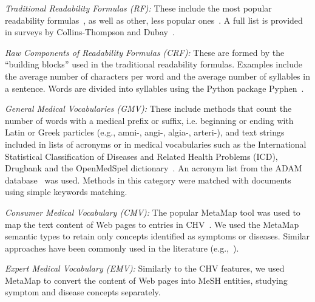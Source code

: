 

\textit{Traditional Readability Formulas (RF):}
These include the most popular readability formulas~\cite{cli75,dale48,flesch75}, as well as other, less popular ones~\cite{ari67,gunning52,lix,smog69}. A full list is provided in surveys by Collins-Thompson \cite{collins2014computational} and Dubay~\cite{dubay04}.

\textit{Raw Components of Readability Formulas (CRF):}
These are formed by the ``building blocks'' used in the traditional readability formulas. Examples include the average number of characters per word and the average number of syllables in a sentence. Words are divided into syllables using the Python package Pyphen~\cite{pyphen}.

\textit{General Medical Vocabularies (GMV):}
These include methods that count the number of words with a medical prefix or suffix, i.e. beginning or ending with Latin or Greek particles (e.g., amni-, angi-, algia-, arteri-), and text strings included in lists of acronyms or in medical vocabularies such as the International Statistical Classification of Diseases and Related Health Problems (ICD), Drugbank and the OpenMedSpel dictionary~\cite{openmedspel}. An acronym list from the ADAM database~\cite{zhou2006} was used. Methods in this category were matched with documents using simple keywords matching. %

\textit{Consumer Medical Vocabulary (CMV):}
The popular MetaMap \cite{aronson10} tool was used to map the text content of Web pages to entries in  CHV~\cite{zeng06}.
We used the MetaMap semantic types to retain only concepts identified as symptoms or diseases. Similar approaches have been commonly used in the literature (e.g.,~\cite{pang16,agrafiotesA16,palotti16,yates13}).

\textit{Expert Medical Vocabulary (EMV):}
Similarly to the CHV features, we used MetaMap to convert the content of Web pages into MeSH entities, studying symptom and disease concepts separately. 

